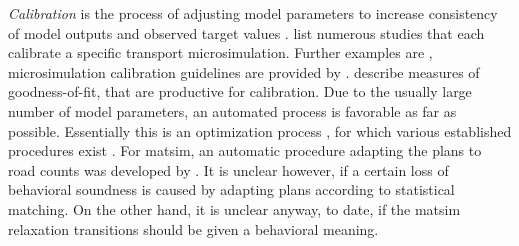 \emph{Calibration} is the process of adjusting model parameters to increase consistency of model outputs and observed target values \citep[][p.348]{HollanderLiu_Transportation_2007} \citep[see also][]{TrucanoEtAl_RESS_2006}. \citet[][Table 1]{HollanderLiu_Transportation_2007} list numerous studies that each calibrate a specific transport microsimulation. Further examples are \citet[][]{SmithEtAl_JTE_2008, KimEtAl_TRR_2005, RutterEtAl_JASA_2009}, microsimulation calibration guidelines are provided by \citet[][]{MilamChao_TRBATPM_2001, WegmannEverett_TechRep_CTRUT_2008, DowlingEtAl_manual_2002}. \citet[][Table 2]{HollanderLiu_Transportation_2007} describe measures of goodness-of-fit, that are productive for calibration. Due to the usually large number of model parameters, an automated process is favorable as far as possible. Essentially this is an optimization process \citep[][p.353]{HollanderLiu_Transportation_2007}, for which various established procedures exist \citep[e.g.,][p.41ff]{ZhangMa_ResRep_PATH_2008}. For \gls{matsim}, an automatic procedure adapting the plans to road counts was developed by \citet[][]{FloetteroedEtAl_TechRep_TRANSPOR_2008}. It is unclear however, if a certain loss of behavioral soundness is caused by adapting plans according to statistical matching. On the other hand, it is unclear anyway, to date, if the \gls{matsim} relaxation transitions should be given a behavioral meaning.

